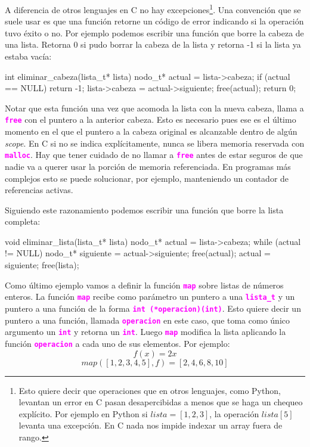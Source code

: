 \documentclass[]{scrartcl}
\newcommand{\hl}[1]{\textcolor{magenta}{\textbf{\texttt{#1}}}}
\begin{document}
A diferencia de otros lenguajes en C no hay excepciones\footnote{Esto quiere decir que operaciones que en otros lenguajes, como Python, levantan un error en C pasan desapercibidas a menos que se haga un chequeo explícito. Por ejemplo en Python si $lista = [1,2,3]$, la operación $lista[5]$ levanta una excepción. En C nada nos impide indexar un array fuera de rango.}. Una convención que se suele usar es que una función retorne un código de error indicando si la operación tuvo éxito o no. Por ejemplo podemos escribir una función que borre la cabeza de una lista. Retorna 0 si pudo borrar la cabeza de la lista y retorna -1 si la lista ya estaba vacía:

\begin{cbox}[unbreakable]{}
int eliminar_cabeza(lista_t* lista) {
    nodo_t* actual = lista->cabeza;
    if (actual == NULL)
        return -1;
    lista->cabeza = actual->siguiente;
    free(actual);
    return 0;
}
\end{cbox}

Notar que esta función una vez que acomoda la lista con la nueva cabeza, llama a \hl{free} con el puntero a la anterior cabeza. Esto es necesario pues ese es el último momento en el que el puntero a la cabeza original es alcanzable dentro de algún \textit{scope}. En C si no se indica explícitamente, nunca se libera memoria reservada con \hl{malloc}. Hay que tener cuidado de no llamar a \hl{free} antes de estar seguros de que nadie va a querer usar la porción de memoria referenciada. En programas más complejos esto se puede solucionar, por ejemplo, manteniendo un contador de referencias activas.

Siguiendo este razonamiento podemos escribir una función que borre la lista completa:
\begin{cbox}[unbreakable]{}
void eliminar_lista(lista_t* lista) {
    nodo_t* actual = lista->cabeza;
    while (actual != NULL) {
        nodo_t* siguiente = actual->siguiente;
        free(actual);
        actual = siguiente;
    }
    free(lista);
}
\end{cbox}

Como último ejemplo vamos a definir la función \hl{map} sobre listas de números enteros. La función \hl{map} recibe como parámetro un puntero a una \hl{lista\_t} y un puntero a una función de la forma \hl{int (*operacion)(int)}. Esto quiere decir un puntero a una función, llamada \hl{operacion} en este caso, que toma como único argumento un \hl{int} y retorna un \hl{int}. Luego \hl{map} modifica la lista aplicando la función \hl{operacion} a cada uno de sus elementos. 
Por ejemplo:
$$
f(x) = 2x
$$
$$
map([1,2,3,4,5], f) = [2,4,6,8,10]
$$
\end{document}
